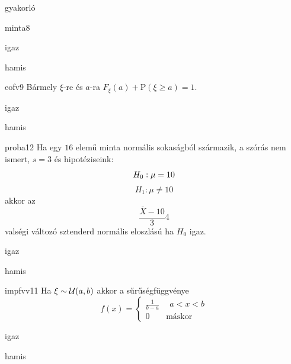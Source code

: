 \documentclass[12pt]{article}
\begin{document}
\begin{quiz}{gyakorló}
\begin{multi}[feedback={Az $s^2$ torzítatlan becslése a sokasági (elméleti) szórásnégyzetnek}]{minta8}
\item igaz
\item* hamis
\end{multi}
\begin{multi}[feedback={Komplementer események.}]{eofv9}
Bármely $\xi$-re és $a$-ra $F_{\xi}(a)+\mathrm{P}(\xi\ge a)=1$.
\item* igaz
\item hamis
\end{multi}
\begin{multi}[feedback={A feltételek mellett a fenti Student (t) eloszlású.}]{proba12}
Ha egy $16$ elemű minta normális sokaságból származik, a szórás nem ismert, $s=3$ és hipotéziseink:
$$
H_0: \mu=10 \\
$$
$$
H_1: \mu\neq 10
$$
akkor az 
$$
\frac{\overline{X}-10}{3}4
$$
valségi változó sztenderd normális eloszlású ha $H_0$ igaz.
\item igaz
\item* hamis
\end{multi}
\begin{multi}[feedback={Def.}]{impfvv11}
Ha $\xi\sim {\cal U}(a,b)$ akkor a sűrűségfüggvénye 
$$
f(x)=
\begin{cases}
\frac{1}{b-a} & \ \ a<x<b \\
0 & \text{máskor} 
\end{cases}
$$
\item* igaz
\item hamis
\end{multi}
\end{quiz}
\end{document}

